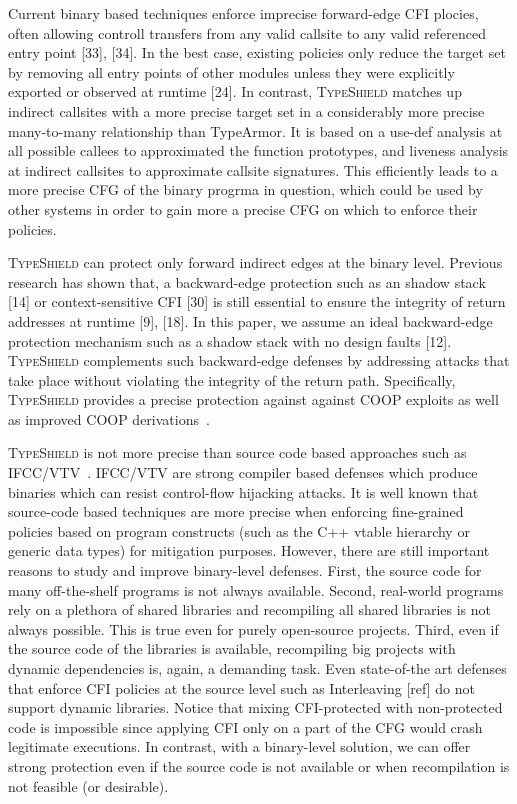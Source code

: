 Current binary based techniques enforce imprecise forward-edge CFI 
plocies, often allowing controll transfers from any valid callsite 
to any valid referenced entry point [33], [34]. 
In the best case, existing policies only reduce the target set by
removing all entry points of other modules unless they were
explicitly exported or observed at runtime [24]. 
In contrast, \textsc{TypeShield} matches up indirect callsites with a more precise
target set in a considerably more precise many-to-many relationship than TypeArmor.
It is based on a use-def analysis at all possible callees to approximated the function prototypes, 
and liveness analysis at indirect callsites to approximate callsite signatures. This 
efficiently leads to a more precise CFG of the binary progrma in question, 
which could be used by other systems in order to gain more a precise CFG on which to 
enforce their policies.

\textsc{TypeShield} can protect only forward indirect edges at the binary level.
Previous research has shown that, a backward-edge protection 
such as an shadow stack [14] or context-sensitive
CFI [30] is still essential to ensure the integrity of return addresses at 
runtime [9], [18]. In this paper, we assume an ideal
backward-edge protection mechanism such as a shadow
stack with no design faults [12]. 
\textsc{TypeShield} complements such backward-edge defenses by addressing
attacks that take place without violating the integrity of the return path.
Specifically, \textsc{TypeShield} provides a precise protection 
against against COOP exploits as well as improved COOP 
derivations~\cite{crane:readactor++, subversive-c:lettner, ctf:coop, loop:oriented}.

\textsc{TypeShield} is not more precise than source code based
approaches such as IFCC/VTV~\cite{vtv:tice}.
IFCC/VTV are strong compiler based defenses which produce binaries which can resist control-flow
hijacking attacks. It is well known that source-code based techniques are more precise 
when enforcing fine-grained policies based on program constructs (such as
the C++ vtable hierarchy or generic data types) for mitigation
purposes. However, there are still important reasons to study
and improve binary-level defenses. First, the source code
for many off-the-shelf programs is not always available.
Second, real-world programs rely on a plethora of shared
libraries and recompiling all shared libraries is not always
possible. This is true even for purely open-source projects.
Third, even if the source code of the libraries is
available, recompiling big projects with dynamic dependencies is, 
again, a demanding task. Even state-of-the art
defenses that enforce CFI policies at the source level such
as Interleaving [ref] do not support dynamic libraries.
Notice that mixing CFI-protected with non-protected code is impossible since
applying CFI only on a part of the CFG would crash legitimate executions.
In contrast, with a binary-level solution, we
can offer strong protection even if the source code is not
available or when recompilation is not feasible (or desirable).


